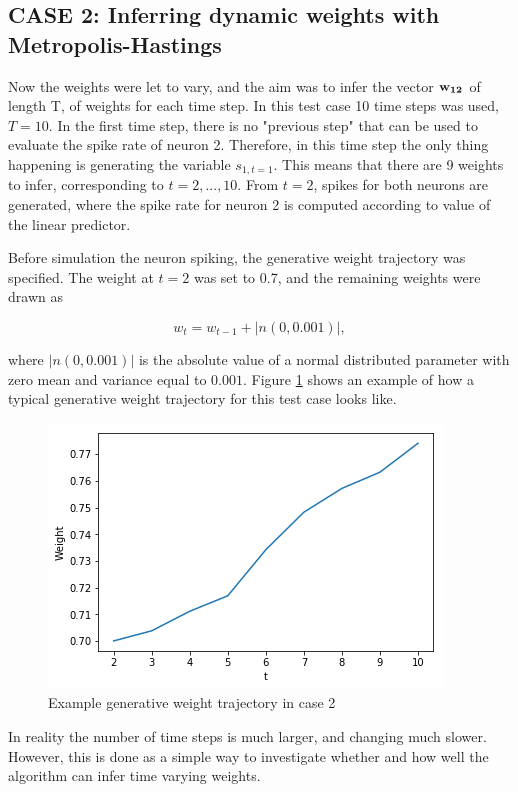 \subsection{CASE 2: Inferring dynamic weights with Metropolis-Hastings}
Now the weights were let to vary, and the aim was to infer the vector ${\bf w_{12}}$ of length T, of weights for each time step. In this test case 10 time steps was used, $T=10$. In the first time step, there is no "previous step" that can be used to evaluate the spike rate of neuron 2. Therefore, in this time step the only thing happening is generating the variable $s_{1,t=1}$. This means that there are 9 weights to infer, corresponding to $t=2,...,10$. From $t=2$, spikes for both neurons are generated, where the spike rate for neuron 2 is computed according to value of the linear predictor. 

Before simulation the neuron spiking, the generative weight trajectory was specified. The weight at $t=2$ was set to 0.7, and the remaining weights were drawn as

\begin{equation}
    w_{t} = w_{t-1} + |n(0,0.001)|,
\end{equation}

where $|n(0,0.001)|$ is the absolute value of a normal distributed parameter with zero mean and variance equal to $0.001$. Figure \ref{fig:Generative} shows an example of how a typical generative weight trajectory for this test case looks like. 

\begin{figure}
\caption{Example generative weight trajectory in case 2}
\label{fig:Generative}
    \centering
    \includegraphics[scale=0.8]{fig/UL.png}
\end{figure}


In reality the number of time steps is much larger, and changing much slower. However, this is done as a simple way to investigate whether and how well the algorithm can infer time varying weights. 

